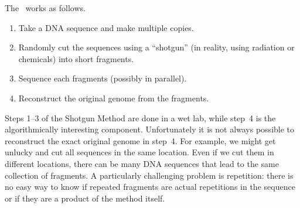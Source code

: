 \begin{definition}

The~ works as follows.
\begin{enumerate}
\item Take a DNA sequence and make multiple copies.  

\item Randomly cut the sequences using a ``shotgun'' (in reality,
  using radiation or chemicals) into short fragments.

\item Sequence each fragments (possibly in parallel).

\item Reconstruct the original genome from the fragments.  
\end{enumerate}
\end{definition}

\begin{remark}
Steps 1--3 of the Shotgun Method are done in a wet lab, while step~4
is the algorithmically interesting component.
%
%
Unfortunately it is not always possible to reconstruct the exact
original genome in step~4. 
%
For example, we might get unlucky and cut all sequences in the same
location.  
%
Even if we cut them in different locations, there can be many DNA
sequences that lead to the same collection of fragments. 
%
A particularly challenging problem is repetition: there is no easy way
to know if repeated fragments are actual repetitions in the sequence
or if they are a product of the method itself.
%
\end{remark}




